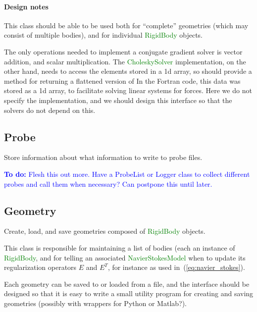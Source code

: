 \documentclass[11pt]{article}
\def\todo#1{\textcolor{blue}{{\bf To do:} #1}}
\def\class#1{\textcolor{green}{\ttfamily\small #1}} %
\begin{document}
\paragraph{Design notes}
This class should be able to be used both for ``complete'' geometries (which may consist of multiple bodies), and for individual \class{RigidBody} objects.

The only operations needed to implement a conjugate gradient solver is vector addition, and scalar multiplication.  The \class{CholeskySolver} implementation, on the other hand, needs to access the elements stored in a 1d array, so should provide a method for returning a flattened version of 
In the Fortran code, this data was stored as a 1d array, to facilitate solving linear systems for forces.  Here we do not specify the implementation, and we should design this interface so that the solvers do not depend on this.

\subsection{Probe}
Store information about what information to write to probe files.

\todo{Flesh this out more.  Have a ProbeList or Logger class to collect different probes and call them when necessary?  Can postpone this until later.}

\subsection{Geometry}
Create, load, and save geometries composed of \class{RigidBody} objects.

This class is responsible for maintaining a list of bodies (each an instance of \class{RigidBody}, and for telling an associated \class{NavierStokesModel} when to update its regularization operators $E$ and $E^T$, for instance as used in~(\ref{eq:navier_stokes}).

Each geometry can be saved to or loaded from a file, and the interface should be designed so that it is easy to write a small utility program for creating and saving geometries (possibly with wrappers for Python or Matlab?).  
\end{document}
